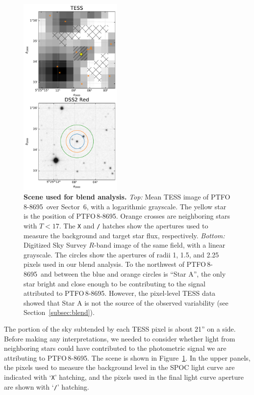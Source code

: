 \documentclass[12pt,twocolumn,tighten]{aastex62}
\newcommand{\ptfo}{PTFO$\,$8-8695}
\begin{document}
\begin{figure}[t]
	\begin{center}
		\leavevmode
		\includegraphics[width=0.45\textwidth]{f4.pdf}
	\end{center}
	\vspace{-0.7cm}
	\caption{ {\bf Scene used for blend analysis.}
    {\it Top:} Mean TESS image of \ptfo\ over Sector~6, with a
    logarithmic grayscale. The yellow star is the position of \ptfo.
    Orange crosses are neighboring stars with $T<17$. The \texttt{X}
    and \texttt{/} hatches show the apertures used to measure the
    background and target star flux, respectively.  {\it Bottom:}
    Digitized Sky Survey $R$-band image of the same field, with a
    linear grayscale. The circles show the apertures of radii 1, 1.5,
    and 2.25 pixels used in our blend analysis. To the northwest of
    \ptfo\ and between the blue and orange circles is ``Star A'', the
    only star bright and close enough to be contributing to the signal
    attributed to \ptfo. However, the pixel-level TESS data showed
    that Star A is not the source of the observed variability (see
    Section~\ref{subsec:blend}).
		\label{fig:scene}
	}
\end{figure}

The portion of the sky subtended by each TESS pixel is about 21'' on a
side. Before making any interpretations, we needed to consider whether
light from neighboring stars could have contributed to the photometric
signal we are attributing to \ptfo. The scene is shown in
Figure~\ref{fig:scene}.  In the upper panels, the pixels used to
measure the background level in the SPOC light curve are indicated
with `\texttt{X}' hatching, and the pixels used in the final light
curve aperture are shown with `\texttt{/}' hatching.
\end{document}
